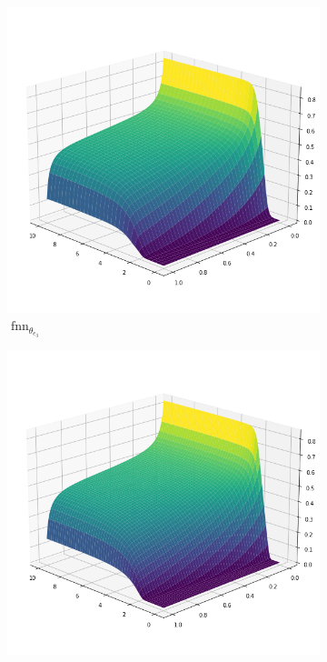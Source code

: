 \begin{figure}[H]
    \begin{center}
        \begin{subfigure}[b]{0.4\textwidth}
            \begin{center}
                \includegraphics[scale=0.35]{img/Kante3.png}
            \end{center}
            \caption{$\operatorname{fnn}_{\theta_{e_3}}$}
        \end{subfigure} \hspace{15mm}
        \begin{subfigure}[b]{0.4\textwidth}
            \begin{center}
                \includegraphics[scale=0.35]{img/FVM3.png}

\end{center}
\end{subfigure}
\end{center}
\end{figure}
